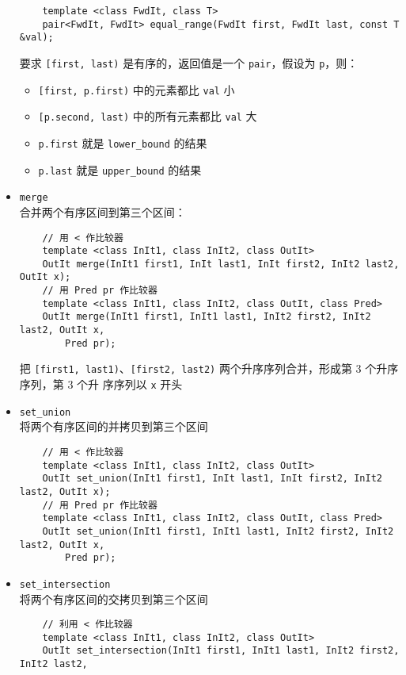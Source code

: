 \documentclass[UTF8]{ctexart}
\begin{document}
\begin{itemize}
    \begin{verbatim}
    template <class FwdIt, class T>
    pair<FwdIt, FwdIt> equal_range(FwdIt first, FwdIt last, const T &val);
    \end{verbatim}
    要求 \texttt{[first, last)} 是有序的，返回值是一个 \texttt{pair}，假设为 \texttt{p}，则：
    \begin{itemize}
        \item \texttt{[first, p.first)} 中的元素都比 \texttt{val} 小
        \item \texttt{[p.second, last)} 中的所有元素都比 \texttt{val} 大
        \item \texttt{p.first} 就是 \texttt{lower\_bound} 的结果
        \item \texttt{p.last} 就是 \texttt{upper\_bound} 的结果
    \end{itemize}
    \item \texttt{merge} \\
    合并两个有序区间到第三个区间：
    \begin{verbatim}
    // 用 < 作比较器
    template <class InIt1, class InIt2, class OutIt>
    OutIt merge(InIt1 first1, InIt last1, InIt first2, InIt2 last2, OutIt x);
    // 用 Pred pr 作比较器
    template <class InIt1, class InIt2, class OutIt, class Pred>
    OutIt merge(InIt1 first1, InIt1 last1, InIt2 first2, InIt2 last2, OutIt x,
        Pred pr);
    \end{verbatim}
    把 \texttt{[first1, last1)}、\texttt{[first2, last2)} 两个升序序列合并，形成第 3 个升序序列，第 3 个升
    序序列以 \texttt{x} 开头
    \item \texttt{set\_union} \\
    将两个有序区间的并拷贝到第三个区间
    \begin{verbatim}
    // 用 < 作比较器
    template <class InIt1, class InIt2, class OutIt>
    OutIt set_union(InIt1 first1, InIt last1, InIt first2, InIt2 last2, OutIt x);
    // 用 Pred pr 作比较器
    template <class InIt1, class InIt2, class OutIt, class Pred>
    OutIt set_union(InIt1 first1, InIt1 last1, InIt2 first2, InIt2 last2, OutIt x,
        Pred pr);
    \end{verbatim}
    \item \texttt{set\_intersection} \\
    将两个有序区间的交拷贝到第三个区间
    \begin{verbatim}
    // 利用 < 作比较器
    template <class InIt1, class InIt2, class OutIt>
    OutIt set_intersection(InIt1 first1, InIt1 last1, InIt2 first2, InIt2 last2,

\end{verbatim}
\end{itemize}
\end{document}
